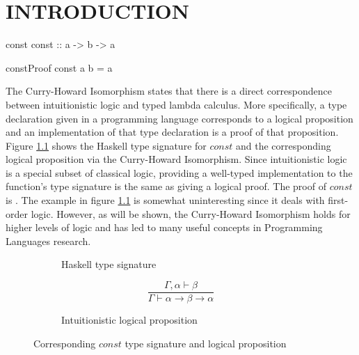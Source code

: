 \chapter{INTRODUCTION}\label{ch:intro}

\begin{SaveVerbatim}{const}
const :: a -> b -> a
\end{SaveVerbatim}

\begin{SaveVerbatim}{constProof}
const a b = a
\end{SaveVerbatim}

The Curry-Howard Isomorphism states that there is a direct correspondence between intuitionistic logic and typed lambda calculus. More specifically, a type declaration given in a programming language corresponds to a logical proposition and an implementation of that type declaration is a proof of that proposition. Figure \ref{fig:const} shows the Haskell type signature for $const$ and the corresponding logical proposition via the Curry-Howard Isomorphism. Since intuitionistic logic is a special subset of classical logic, providing a well-typed implementation to the function's type signature is the same as giving a logical proof. The proof of $const$ is . The example in figure \ref{fig:const} is somewhat uninteresting since it deals with first-order logic. However, as will be shown, the Curry-Howard Isomorphism holds for higher levels of logic and has led to many useful concepts in Programming Languages research.

\begin{figure}
  \begin{subfigure}[b]{.5\linewidth}
    \vspace{.2in}
    \caption{Haskell type signature}
  \end{subfigure}
  \begin{subfigure}[b]{.5\linewidth}
    \centering
    \begin{equation*}
    \frac{\Gamma, \alpha \vdash \beta}{\Gamma \vdash \alpha \rightarrow \beta \rightarrow \alpha}
    \end{equation*}
    \caption{Intuitionistic logical proposition}
  \end{subfigure}
  \caption{Corresponding $const$ type signature and logical proposition}
  \label{fig:const}
\end{figure}

